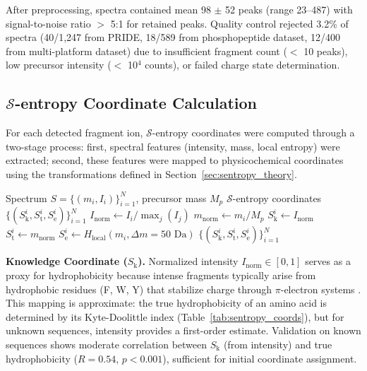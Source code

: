 \documentclass[11pt,twocolumn]{article}
\newcommand{\sentropy}{$\mathcal{S}$-entropy}
\newcommand{\Sk}{S_{\text{k}}}
\newcommand{\St}{S_{\text{t}}}
\newcommand{\Se}{S_{\text{e}}}
\begin{document}
After preprocessing, spectra contained mean 98 $\pm$ 52 peaks (range 23--487) with signal-to-noise ratio $>$ 5:1 for retained peaks. Quality control rejected 3.2\% of spectra (40/1,247 from PRIDE, 18/589 from phosphopeptide dataset, 12/400 from multi-platform dataset) due to insufficient fragment count ($<$ 10 peaks), low precursor intensity ($<$ 10$^4$ counts), or failed charge state determination.

\subsection{\texorpdfstring{\sentropy{}}{S-Entropy} Coordinate Calculation}

For each detected fragment ion, \sentropy{} coordinates were computed through a two-stage process: first, spectral features (intensity, mass, local entropy) were extracted; second, these features were mapped to physicochemical coordinates using the transformations defined in Section~\ref{sec:sentropy_theory}.

\begin{algorithm}[h]
\caption{\sentropy{} Coordinate Calculation from Spectrum}
\label{alg:sentropy}
\begin{algorithmic}[1]
\Require Spectrum $S = \{(m_i, I_i)\}_{i=1}^N$, precursor mass $M_p$
\Ensure \sentropy{} coordinates $\{(\Sk^i, \St^i, \Se^i)\}_{i=1}^N$
    \State $I_{\text{norm}} \gets I_i / \max_j(I_j)$ 
    \State $m_{\text{norm}} \gets m_i / M_p$ 
    \State $\Sk^i \gets I_{\text{norm}}$ 
    \State $\St^i \gets m_{\text{norm}}$ 
    \State $\Se^i \gets H_{\text{local}}(m_i, \Delta m = 50 \text{ Da})$ 
\EndFor
\State \Return $\{(\Sk^i, \St^i, \Se^i)\}_{i=1}^N$
\end{algorithmic}
\end{algorithm}

\textbf{Knowledge Coordinate ($\Sk$).} Normalized intensity $I_{\text{norm}} \in [0, 1]$ serves as a proxy for hydrophobicity because intense fragments typically arise from hydrophobic residues (F, W, Y) that stabilize charge through $\pi$-electron systems \cite{kapp2003overview}. This mapping is approximate: the true hydrophobicity of an amino acid is determined by its Kyte-Doolittle index (Table~\ref{tab:sentropy_coords}), but for unknown sequences, intensity provides a first-order estimate. Validation on known sequences shows moderate correlation between $\Sk$ (from intensity) and true hydrophobicity ($R = 0.54$, $p < 0.001$), sufficient for initial coordinate assignment.
\end{document}

